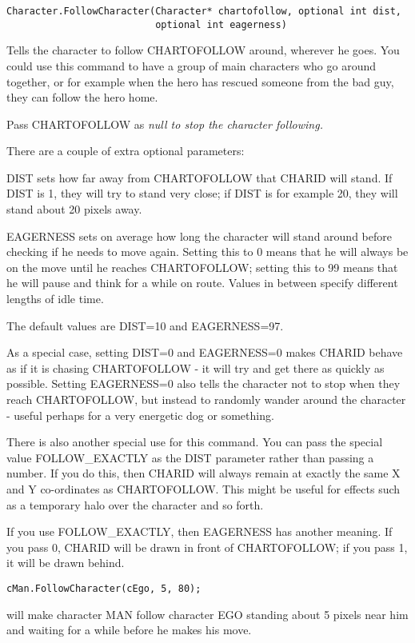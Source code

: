 \begin{verbatim}
Character.FollowCharacter(Character* chartofollow, optional int dist,
                          optional int eagerness)
\end{verbatim}
Tells the character to follow CHARTOFOLLOW around, wherever he goes.
You could use this command to have a group of main characters who go around
together, or for example when the hero has rescued someone from the bad
guy, they can follow the hero home.

Pass CHARTOFOLLOW as \it{null} to stop the character following.

There are a couple of extra optional parameters:

DIST sets how far away from CHARTOFOLLOW that CHARID will
stand. If DIST is 1, they will try to stand very close; if DIST is for
example 20, they will stand about 20 pixels away.

EAGERNESS sets on average how long the character will stand around before
checking if he needs to move again. Setting this to 0 means that he will
always be on the move until he reaches CHARTOFOLLOW; setting this to 99
means that he will pause and think for a while on route. Values in between
specify different lengths of idle time.

The default values are DIST=10 and EAGERNESS=97.

As a special case, setting DIST=0 and EAGERNESS=0 makes CHARID behave as if
it is chasing CHARTOFOLLOW - it will try and get there as quickly as possible.
Setting EAGERNESS=0 also tells the character not to stop when they reach
CHARTOFOLLOW, but instead to randomly wander around the character - useful
perhaps for a very energetic dog or something.

There is also another special use for this command. You can pass the special
value FOLLOW_EXACTLY as the DIST parameter rather than passing a number. If you
do this, then CHARID will always remain at exactly the same X and Y co-ordinates
as CHARTOFOLLOW. This might be useful for effects such as a temporary halo over
the character and so forth.

If you use FOLLOW_EXACTLY, then EAGERNESS has another meaning. If you pass 0, CHARID
will be drawn in front of CHARTOFOLLOW; if you pass 1, it will be drawn behind.

\begin{verbatim}
cMan.FollowCharacter(cEgo, 5, 80);
\end{verbatim}
will make character MAN follow character EGO standing about 5 pixels near
him and waiting for a while before he makes his move.


